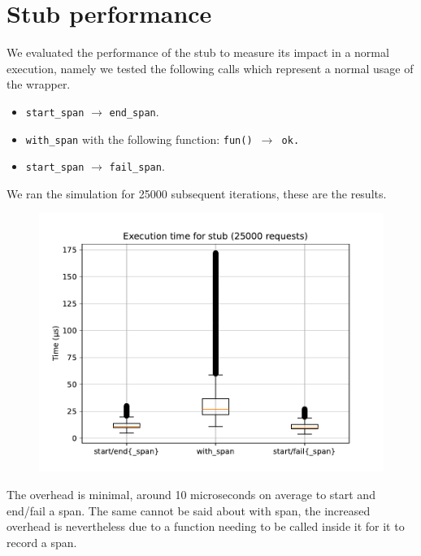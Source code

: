 \section{Stub performance}
    We evaluated the performance of the stub to measure its impact in a normal execution, namely we tested the following calls which represent a normal usage of the wrapper.
    \begin{itemize}
        \item \texttt{start\_span} $\rightarrow$ \texttt{end\_span}.
        \item \texttt{with\_span} with the following function: \texttt{fun() $\rightarrow$ ok.}
        \item \texttt{start\_span} $\rightarrow$ \texttt{fail\_span}.
    \end{itemize}

    We ran the simulation for 25000 subsequent iterations, these are the results.
    \begin{figure}[H]
        \begin{center}
            \includegraphics[width=0.8\linewidth]{img/stub.pdf}
        \end{center}
    \end{figure}

    The overhead is minimal, around 10 microseconds on average to start and end/fail a span. The same cannot be said about with span, the increased overhead is nevertheless due to a function needing to be called inside it for it to record a span. 

